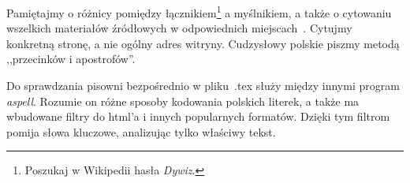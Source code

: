 \documentclass{article}
\begin{document}
Pamiętajmy o różnicy pomiędzy łącznikiem\footnote{Poszukaj w Wikipedii hasła \emph{Dywiz}.} a myślnikiem, a także o cytowaniu wszelkich materiałów źródłowych w odpowiednich miejscach~\cite{WikiDash}. Cytujmy konkretną stronę, a nie ogólny adres witryny. Cudzysłowy polskie piszmy metodą ,,przecinków i apostrofów''.

Do sprawdzania pisowni bezpośrednio w pliku\ .tex służy między innymi program \emph{aspell}. Rozumie on różne sposoby kodowania polskich literek, a także ma wbudowane filtry do html'a i innych popularnych formatów. Dzięki tym filtrom pomija słowa kluczowe, analizując tylko właściwy tekst.







\end{document}
